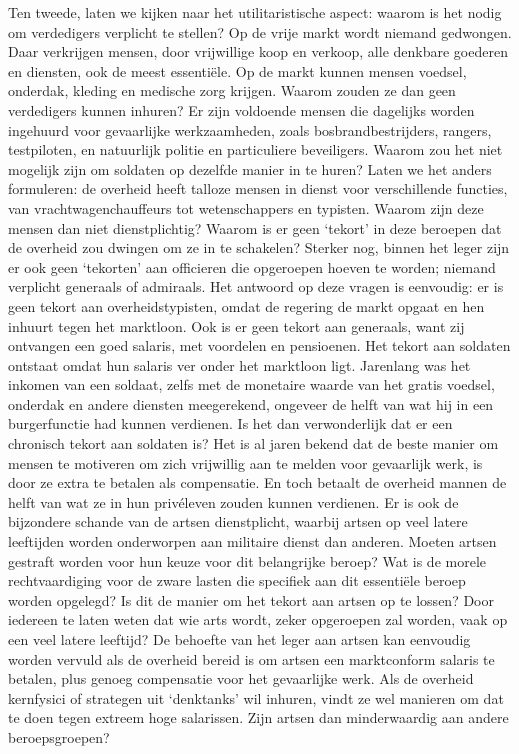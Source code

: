 \documentclass[
  a5paper,
  smalldemyvopaper,10pt,twoside,onecolumn,openright,extrafontsizes,hidelinks]{memoir}
\begin{document}
Ten tweede, laten we kijken naar het utilitaristische aspect: waarom is
het nodig om verdedigers verplicht te stellen? Op de vrije markt wordt
niemand gedwongen. Daar verkrijgen mensen, door vrijwillige koop en
verkoop, alle denkbare goederen en diensten, ook de meest essentiële. Op
de markt kunnen mensen voedsel, onderdak, kleding en medische zorg
krijgen. Waarom zouden ze dan geen verdedigers kunnen inhuren? Er zijn
voldoende mensen die dagelijks worden ingehuurd voor gevaarlijke
werkzaamheden, zoals bosbrandbestrijders, rangers, testpiloten, en
natuurlijk politie en particuliere beveiligers. Waarom zou het niet
mogelijk zijn om soldaten op dezelfde manier in te huren? Laten we het
anders formuleren: de overheid heeft talloze mensen in dienst voor
verschillende functies, van vrachtwagenchauffeurs tot wetenschappers en
typisten. Waarom zijn deze mensen dan niet dienstplichtig? Waarom is er
geen `tekort' in deze beroepen dat de overheid zou dwingen om ze in te
schakelen? Sterker nog, binnen het leger zijn er ook geen `tekorten' aan
officieren die opgeroepen hoeven te worden; niemand verplicht generaals
of admiraals. Het antwoord op deze vragen is eenvoudig: er is geen
tekort aan overheidstypisten, omdat de regering de markt opgaat en hen
inhuurt tegen het marktloon. Ook is er geen tekort aan generaals, want
zij ontvangen een goed salaris, met voordelen en pensioenen. Het tekort
aan soldaten ontstaat omdat hun salaris ver onder het marktloon ligt.
Jarenlang was het inkomen van een soldaat, zelfs met de monetaire waarde
van het gratis voedsel, onderdak en andere diensten meegerekend,
ongeveer de helft van wat hij in een burgerfunctie had kunnen verdienen.
Is het dan verwonderlijk dat er een chronisch tekort aan soldaten is?
Het is al jaren bekend dat de beste manier om mensen te motiveren om
zich vrijwillig aan te melden voor gevaarlijk werk, is door ze extra te
betalen als compensatie. En toch betaalt de overheid mannen de helft van
wat ze in hun privéleven zouden kunnen verdienen. Er is ook de
bijzondere schande van de artsen dienstplicht, waarbij artsen op veel
latere leeftijden worden onderworpen aan militaire dienst dan anderen.
Moeten artsen gestraft worden voor hun keuze voor dit belangrijke
beroep? Wat is de morele rechtvaardiging voor de zware lasten die
specifiek aan dit essentiële beroep worden opgelegd? Is dit de manier om
het tekort aan artsen op te lossen? Door iedereen te laten weten dat wie
arts wordt, zeker opgeroepen zal worden, vaak op een veel latere
leeftijd? De behoefte van het leger aan artsen kan eenvoudig worden
vervuld als de overheid bereid is om artsen een marktconform salaris te
betalen, plus genoeg compensatie voor het gevaarlijke werk. Als de
overheid kernfysici of strategen uit `denktanks' wil inhuren, vindt ze
wel manieren om dat te doen tegen extreem hoge salarissen. Zijn artsen
dan minderwaardig aan andere beroepsgroepen?
\end{document}
